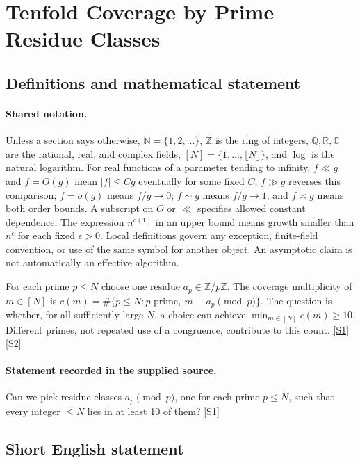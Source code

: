 \documentclass[11pt,a4paper]{article}
\newcommand{\N}{\mathbb{N}}
\newcommand{\Z}{\mathbb{Z}}
\newcommand{\Q}{\mathbb{Q}}
\newcommand{\R}{\mathbb{R}}
\newcommand{\C}{\mathbb{C}}
\newcommand{\sref}[2]{\hyperlink{source:#1:#2}{[S#2]}}
\begin{document}
\section{Tenfold Coverage by Prime Residue Classes}\label{statement}


\subsection{Definitions and mathematical statement}

\paragraph{Shared notation.}Unless a section says otherwise, $\N=\{1,2,\ldots\}$,
$\Z$ is the ring of integers, $\Q,\R,\C$ are the rational, real, and complex
fields, $[N]=\{1,\ldots,\lfloor N\rfloor\}$, and $\log$ is the natural
logarithm. For real functions of a parameter tending to infinity,
$f\ll g$ and $f=O(g)$ mean $|f|\leq Cg$ eventually for some fixed $C$;
$f\gg g$ reverses this comparison; $f=o(g)$ means $f/g\to0$;
$f\sim g$ means $f/g\to1$; and $f\asymp g$ means both order bounds.
A subscript on $O$ or $\ll$ specifies allowed constant dependence.
The expression $n^{o(1)}$ in an upper bound means growth smaller than
$n^\epsilon$ for each fixed $\epsilon>0$. Local definitions govern any
exception, finite-field convention, or use of the same symbol for another
object. An asymptotic claim is not automatically an effective algorithm.



For each prime $p\leq N$ choose one residue $a_p\in\Z/p\Z$. The coverage multiplicity of $m\in[N]$ is $c(m)=\#\{p\leq N:p\text{ prime},\ m\equiv a_p\pmod p\}$. The question is whether, for all sufficiently large $N$, a choice can achieve $\min_{m\in[N]}c(m)\geq10$. Different primes, not repeated use of a congruence, contribute to this count. \sref{statement}{1} \sref{statement}{2}

\paragraph{Statement recorded in the supplied source.}
Can we pick residue classes $a_p \pmod p$, one for each prime $p \leq N$, such that every integer $\leq N$ lies in at least 10 of them? \sref{statement}{1}

\subsection{Short English statement}
\end{document}
